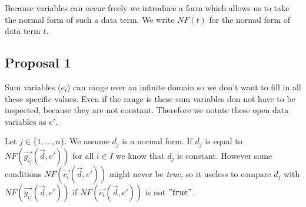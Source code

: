 \documentclass[a4paper,10pt]{article}
\theoremstyle{plain}
\theoremstyle{definition}
\newcommand{\lpe}{linear process equation}
\newcommand{\ovr}{\overrightarrow}
\newcommand{\pp}{process parameter}
\newcommand{\pps}{process parameters}
\newcommand{\ti}{\textit}
\begin{document}
Because variables can occur freely we introduce a form which allows us to take the normal form of such a data term. 
We write $NF(t)$ for the normal form of data term $t$. 






\subsection{Proposal 1} \label{sec:prop1}
Sum variables ($e_i$) %
can range over an infinite domain so we don't want to fill in all these specific values. Even if the range is these sum variables don not have to be inspected, because they are not constant.
 Therefore we notate these open data variables as $e'$.

Let $j \in \lbrace 1, \ldots,  n \rbrace $. We assume $d_j$ is a normal form. If $d_j$ is equal to $NF(\ovr{g_{i_j}}(\ovr{d},e'))$ for all $i \in I$ we know that $d_j$ is constant. However some conditions $NF(\ovr{c_i}(\ovr{d},e'))$ might never be \ti{true}, so it useless to compare $d_j$ with $NF(\ovr{g_{i_j}}(\ovr{d},e'))$  if $NF(\ovr{c_i}(\ovr{d},e'))$ is not  $"true"$. \\
\end{document}
